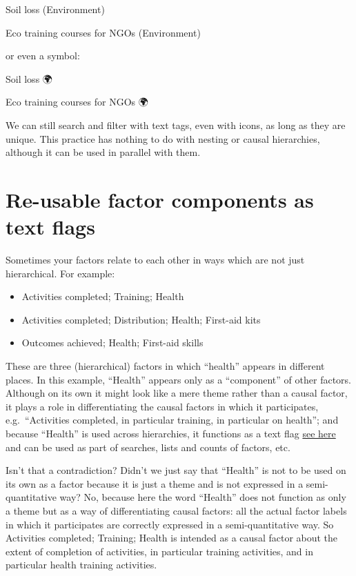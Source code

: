 \documentclass[
]{book}
\begin{document}
Soil loss (Environment)

Eco training courses for NGOs (Environment)

or even a symbol:

Soil loss 🌍

Eco training courses for NGOs 🌍

We can still search and filter with text tags, even with icons, as long as they are unique. This practice has nothing to do with nesting or causal hierarchies, although it can be used in parallel with them.

\hypertarget{re-usable-factor-components-as-text-flags}{%
\section{Re-usable factor components as text flags}\label{re-usable-factor-components-as-text-flags}}

Sometimes your factors relate to each other in ways which are not just hierarchical. For example:

\begin{itemize}
\item
  Activities completed; Training; Health
\item
  Activities completed; Distribution; Health; First-aid kits
\item
  Outcomes achieved; Health; First-aid skills
\end{itemize}

These are three (hierarchical) factors in which ``health'' appears in different places. In this example, ``Health'' appears only as a ``component'' of other factors. Although on its own it might look like a mere theme rather than a causal factor, it plays a role in differentiating the causal factors in which it participates, e.g.~``Activities completed, in particular training, in particular on health''; and because ``Health'' is used across hierarchies, it functions as a text flag \protect\hyperlink{using-flags-in-factor-labels}{see here} and can be used as part of searches, lists and counts of factors, etc.

Isn't that a contradiction? Didn't we just say that ``Health'' is not to be used on its own as a factor because it is just a theme and is not expressed in a semi-quantitative way? No, because here the word ``Health'' does not function as only a theme but as a way of differentiating causal factors: all the actual factor labels in which it participates are correctly expressed in a semi-quantitative way. So Activities completed; Training; Health is intended as a causal factor about the extent of completion of activities, in particular training activities, and in particular health training activities.
\end{document}
